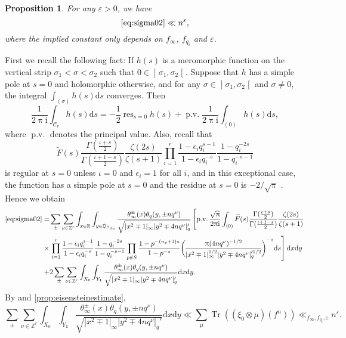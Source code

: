 \documentclass[10pt,oneside,reqno]{amsart}
\makeatletter
\newcommand\lopen{\mathopen{]}}
\newcommand\ropen{\mathclose{[}}
\newcommand\rmd{\mathrm{d}}
\newcommand\rmi{\mathrm{i}}
\newcommand\cC{\mathcal{C}}
\newcommand\QQ{\mathbb{Q}}
\newcommand\RR{\mathbb{R}}
\newcommand\ZZ{\mathbb{Z}}
\newcommand\dpii{2\uppi\rmi}
\DeclareMathOperator\Tr{Tr}
\DeclareMathOperator\res{res}
\DeclareMathOperator\pv{p.v.}
\newcommand\fin{\mathrm{fin}}
\newcommand\legendresymbol[2]{\genfrac{(}{)}{}{}{#1}{#2}}
\theoremstyle{THEOREM}
\newtheorem{proposition}[theorem]{Proposition}
\theoremstyle{DEFINITION}
\theoremstyle{EXERCISE}
\numberwithin{equation}{section}
\renewenvironment{proof}[1][\proofname]{\par
  \vspace{-6pt}
  \pushQED{\qed}
  \normalfont \topsep6\p@\@plus6\p@\relax
  \trivlist
  \item[\hskip\labelsep\rmfamily\bfseries
    #1\@addpunct{:}]\ignorespaces
}{
  \popQED\endtrivlist\@endpefalse
  \vspace{-6pt}
}
\makeatother
\begin{document}
\begin{proposition}\label{prop:sigma02estimate}
For any $\varepsilon>0$, we have
\[
\eqref{eq:sigma02}\ll n^\varepsilon,
\] 
where the implied constant only depends on $f_\infty$, $f_{q_i}$ and $\varepsilon$.
\end{proposition}
\begin{proof}
First we recall the following fact: If $h(s)$ is a meromorphic function on the vertical strip $\sigma_1<\sigma<\sigma_2$ such that $0\in \lopen\sigma_1,\sigma_2\ropen$. Suppose that  $h$ has a simple pole at $s=0$ and holomorphic otherwise, and for any $\sigma\in  \lopen\sigma_1,\sigma_2\ropen$ and $\sigma\neq 0$, the integral $\int_{(\sigma)}h(s)\rmd s$ converges. Then
\[
\frac{1}{\dpii}\int_{\cC_v}h(s)\rmd s=-\frac{1}{2}\res_{s=0}h(s)+\pv\frac{1}{\dpii}\int_{(0)}h(s)\rmd s,
\]
where $\pv$ denotes the principal value. 
Also, recall that 
\[
\widetilde{F}(s)\frac{\Gamma(\frac{\iota+s}{2})}{\Gamma(\frac{\iota+1-s}{2})} \frac{\zeta(2s)}{\zeta(s+1)}\prod_{i=1}^{r}\frac{1-\epsilon_i q_i^{s-1}}{1-\epsilon_i q_i^{-s}} \frac{1-q_i^{-2s}}{1-q_i^{-s-1}}
\]
is regular at $s=0$ unless $\iota=0$ and $\epsilon_i=1$ for all $i$, and in this exceptional case, the function has a simple pole at $s=0$ and the residue at $s=0$ is
$-2/\sqrt{\uppi}$ \cite[Theorem 6.1]{cheng2025}. 
Hence we obtain
\begin{align*}
  \eqref{eq:sigma02} =& \sum_{\pm}\sum_{\nu\in \ZZ^r}\int_{x\in \RR}\int_{y\in \QQ_{S_\fin}}\frac{\theta_\infty^\pm(x)\theta_{q}(y,\pm nq^\nu)}{\sqrt{|x^2\mp 1|_\infty|y^2\mp 4nq^\nu|_q'}}\left[\pv\frac{\sqrt{\uppi}}{\dpii}\int_{(0)}\widetilde{F}(s) \frac{\Gamma(\frac{\iota+s}{2})}{\Gamma(\frac{\iota+1-s}{2})}\frac{\zeta(2s)}{\zeta(s+1)} \right.\\
  \times&\left. \prod_{i=1}^{r}\frac{1-\epsilon_i q_i^{s-1}}{1-\epsilon_i q_i^{-s}}\frac{1-q_i^{-2s}}{1-q_i^{-s-1}}\prod_{p\notin S}\frac{1-p^{-(n_p+1)s}}{1-p^{-s}} \legendresymbol{\uppi (4nq^\nu)^{-1/2}}{|x^2\mp 1|_\infty^{1/2}|y^2\mp 4nq^\nu|_q'^{1/2}}^{-s}\rmd s\right]
  \rmd x\rmd y\\
  +&2\sum_{\pm}\sum_{\nu\in \ZZ^r}\int_{X_0}\int_{Y_\mathbf{1}}\frac{\theta_\infty^\pm(x)\theta_q(y,\pm nq^\nu)}{\sqrt{|x^2\mp 1|_\infty|y^2\mp 4nq^\nu|_q'}}\rmd x\rmd y.
\end{align*}
By \cite[Theorem 8.8]{cheng2025} and \autoref{prop:eisensteinestimate},
\[
\sum_{\pm}\sum_{\nu\in \ZZ^r}\int_{X_0}\int_{Y_\mathbf{1}}\frac{\theta_\infty^\pm(x)\theta_q(y,\pm nq^\nu)}{\sqrt{|x^2\mp 1|_\infty|y^2\mp 4nq^\nu|_q'}}\rmd x\rmd y\ll\sum_{\mu}\Tr((\xi_0\otimes\mu)(f^n)) \ll_{f_\infty,f_{q_i},\varepsilon} n^\varepsilon.
\]


\end{proof}
\end{document}
